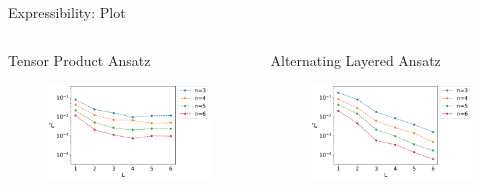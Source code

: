 \documentclass[dvipdfmx,10pt,aspectratio=169]{beamer}
\begin{document}
\begin{frame}{Expressibility: Plot}
    \begin{columns}
        \begin{column}{0.5\textwidth}
            \centering\hspace*{-30pt} Tensor Product Ansatz
            \begin{figure}
                \centering\includegraphics[width=7cm]{product-circuit-exp.pdf}
            \end{figure}
        \end{column}
        
        \begin{column}{0.5\textwidth}
            \centering\hspace*{-30pt} Alternating Layered Ansatz
            \begin{figure}
                \centering\includegraphics[width=7cm]{alt-circuit-exp.pdf}
            \end{figure}
        \end{column}
    \end{columns}
\end{frame}
\end{document}
